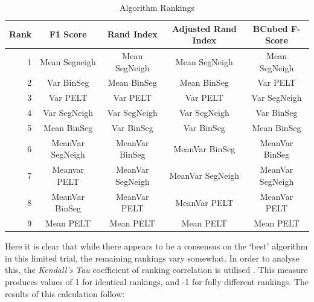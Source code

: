 \documentclass{uvamscse}	%
\begin{document}
\begin{table}[h]
\centering
\begin{tabular}{@{}rcccc@{}}
\toprule
\textbf{Rank} & \textbf{F1 Score} & \textbf{Rand Index} & \textbf{Adjusted Rand Index} & \textbf{BCubed F-Score} \\ \midrule
1 & Mean Segneigh & Mean SegNeigh & Mean SegNeigh & Mean SegNeigh \\
2 & Var BinSeg & Mean BinSeg & Mean BinSeg & Var PELT \\
3 & Var PELT & Var PELT & Var PELT & Var SegNeigh \\
4 & Var SegNeigh & Var SegNeigh & Var SegNeigh & Var BinSeg \\
5 & Mean BinSeg & Var BinSeg & Var BinSeg & Mean BinSeg \\
6 & MeanVar SegNeigh & MeanVar BinSeg & MeanVar BinSeg & MeanVar BinSeg \\
7 & Meanvar PELT & MeanVar SegNeigh & MeanVar SegNeigh & MeanVar SegNeigh \\
8 & MeanVar BinSeg & MeanVar PELT & MeanVar PELT & MeanVar PELT \\
9 & Mean PELT & Mean PELT & Mean PELT & Mean PELT \\ \bottomrule
\end{tabular}
\caption{Algorithm Rankings}
\label{tab:rankings}
\end{table}

Here it is clear that while there appears to be a consensus on the `best' algorithm in this limited trial, the remaining rankings vary somewhat. In order to analyse this, the \emph{Kendall's Tau} coefficient of ranking correlation is utilised \cite{KENDALL1938}. This measure produces values of 1 for identical rankings, and -1 for fully different rankings. The results of this calculation follow:

\begin{table}[h]
\centering
{}
\caption{Calculated Kendall's Tau values between pairs of rankings}
\label{tab:tau}
\end{table}
\end{document}

